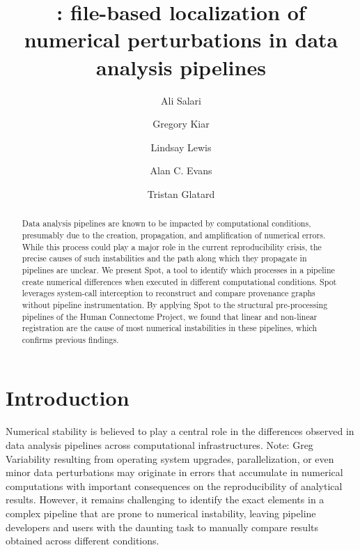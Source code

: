 \documentclass[a4paper,num-refs]{oup-contemporary}
\title{\toolname: file-based localization of numerical perturbations in data analysis pipelines}
\newcommand{\note}[2]{\color{blue}Note: #1\color{black}}
\newcommand{\toolname}[0]{Spot\xspace}
\begin{document}
\author[1]{Ali Salari}
\author[2,3]{Gregory Kiar}
\author[2]{Lindsay Lewis}
\author[2,3]{Alan C. Evans}
\author[1]{Tristan Glatard}


\maketitle

\begin{abstract} 
Data analysis pipelines are known to be impacted by computational conditions, presumably due to the creation,
propagation, and amplification of numerical errors. While this process could
play a major role in the current reproducibility crisis, the precise
causes of such instabilities and the path along which they propagate in
pipelines are unclear. We present \toolname, a tool to identify which
processes in a pipeline create numerical differences
when executed in different computational conditions. \toolname
leverages system-call interception to reconstruct and compare provenance
graphs without pipeline instrumentation. By applying \toolname to the
structural pre-processing pipelines of the Human Connectome
Project, we found that linear and non-linear registration are the cause of
most numerical instabilities in these pipelines, which confirms previous
findings.
\end{abstract}



\section{Introduction}


Numerical stability is believed to play a central role in the differences
observed in data analysis pipelines across computational infrastructures. \note{Greg}{cite or soften claim}
Variability resulting from operating system upgrades, parallelization, or
even minor data perturbations may originate in errors that accumulate in
numerical computations with important consequences on the reproducibility
of analytical results. However, it remains challenging to identify the
exact elements in a complex pipeline that are prone to numerical instability,
leaving pipeline developers and users with the daunting task to manually
compare results obtained across different conditions. 
\end{document}

